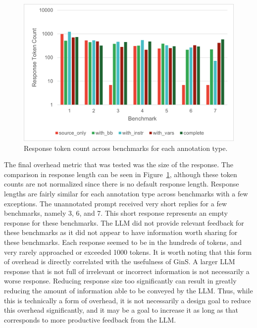 \documentclass[sigconf,nonacm]{acmart}
\begin{document}
\begin{figure}
    \centering
    \includegraphics[width=1\linewidth]{images/ResponseCost.png}
    \caption{Response token count across benchmarks for each annotation type.}
    \label{fig:response}
\end{figure}

The final overhead metric that was tested was the size of the response.
The comparison in response length can be seen in Figure~\ref{fig:response}, although these token counts are not normalized since there is no default response length.
Response lengths are fairly similar for each annotation type across benchmarks with a few exceptions.
The unannotated prompt received very short replies for a few benchmarks, namely 3, 6, and 7.
This short response represents an empty response for these benchmarks.
The LLM did not provide relevant feedback for these benchmarks as it did not appear to have information worth sharing for these benchmarks.
Each response seemed to be in the hundreds of tokens, and very rarely approached or exceeded 1000 tokens.
It is worth noting that this form of overhead is directly correlated with the usefulness of GinS.
A larger LLM response that is not full of irrelevant or incorrect information is not necessarily a worse response.
Reducing response size too significantly can result in greatly reducing the amount of information able to be conveyed by the LLM.
Thus, while this is technically a form of overhead, it is not necessarily a design goal to reduce this overhead significantly, and it may be a goal to increase it as long as that corresponds to more productive feedback from the LLM.
\end{document}

